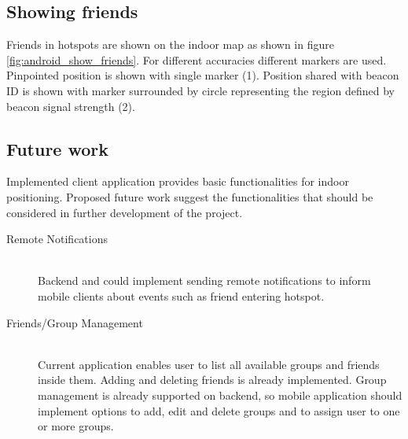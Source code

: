 \subsection{Showing friends}
Friends in hotspots are shown on the indoor map as shown in figure \ref{fig:android_show_friends}. For different accuracies different markers are used. Pinpointed position is shown with single marker (1). Position shared with beacon ID is shown with marker surrounded by circle representing the region defined by beacon signal strength (2).

\subsection{Future work}
Implemented client application provides basic functionalities for indoor positioning. Proposed future work suggest the functionalities that should be considered in further development of the project.

\begin{description}
  \item[Remote Notifications] \hfill \\
  Backend and could implement sending remote notifications to inform mobile clients about events such as friend entering hotspot.
  \item[Friends/Group Management] \hfill \\
  Current application enables user to list all available groups and friends inside them. Adding and deleting friends is already implemented. Group management is already supported on backend, so mobile application should implement options to add, edit and delete groups and to assign user to one or more groups.

\end{description}
